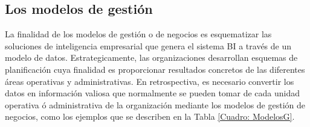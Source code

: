\documentclass[12pt,jou]{apa7}
\begin{document}
\subsection{Los modelos de gestión}

La finalidad de los modelos de gestión o de negocios es esquematizar las soluciones de inteligencia empresarial que genera el sistema BI a través de un modelo de datos. Estrategicamente, las organizaciones desarrollan esquemas de planificación cuya finalidad es proporcionar resultados concretos de las diferentes áreas operativas y administrativas. En retrospectiva, es necesario convertir los datos en información valiosa que normalmente se pueden tomar de cada unidad operativa ó administrativa de la organización mediante los modelos de gestión de negocios, como los ejemplos que se describen en la Tabla \ref{Cuadro: ModelosG}.
\end{document}
